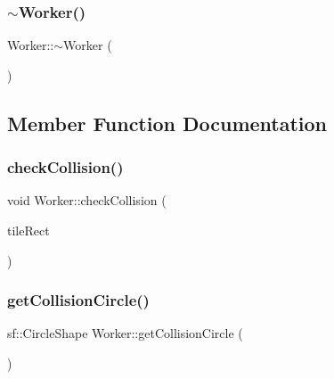 \mbox{\label{class_worker_aa8e4543ef1e93fd9d884269ba30c5bfe}} 
\subsubsection{\texorpdfstring{$\sim$Worker()}{~Worker()}}
{\footnotesize\ttfamily Worker\+::$\sim$\+Worker (\begin{DoxyParamCaption}{ }\end{DoxyParamCaption})}



\subsection{Member Function Documentation}
\mbox{\label{class_worker_a10eed5f8fde0691ec9dd9bb3091a0a6f}} 
\subsubsection{\texorpdfstring{checkCollision()}{checkCollision()}}
{\footnotesize\ttfamily void Worker\+::check\+Collision (\begin{DoxyParamCaption}\item[{sf\+::\+Float\+Rect}]{tile\+Rect }\end{DoxyParamCaption})}

\mbox{\label{class_worker_abc2c59297e19f8f5fb6f35131a3d2e3a}} 
\subsubsection{\texorpdfstring{getCollisionCircle()}{getCollisionCircle()}}
{\footnotesize\ttfamily sf\+::\+Circle\+Shape Worker\+::get\+Collision\+Circle (\begin{DoxyParamCaption}{ }\end{DoxyParamCaption})}

\mbox{\label{class_worker_a47aa8d5eb21900530255e6a66b7801d9}} 
